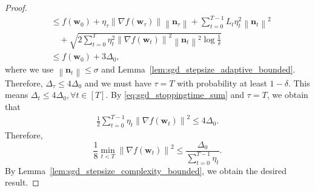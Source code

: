 \documentclass{article}
\newcommand{\Norm}[1]{\left\|#1\right\|}
\newcommand{\bw}{\mathbf{w}}
\newcommand{\bn}{\mathbf{n}}
\begin{document}
\begin{proof}
\begin{align*}
        &\leq f(\bw_0)+\eta_\tau{\Norm{\nabla f(\bw_\tau)}}{\Norm{\bn_\tau}}
        +\sum_{t=0}^{T-1}L_t\eta_t^2\Norm{\bn_t}^2\\
        &\quad+\sqrt{2\sum_{t=0}^T\eta_t^2\Norm{\nabla f(\bw_t)}^2\Norm{\bn_t}^2\log\frac{1}{\delta}}\\
        &\leq f(\bw_0)+3\Delta_0,
    \end{align*}
    where we use $\Norm{\bn_t}\leq\sigma$ and Lemma~\ref{lem:sgd_stepsize_adaptive_bounded}.
    Therefore, $\Delta_\tau\leq 4\Delta_0$ and we must have $\tau=T$ with probability at least $1-\delta$. This means $\Delta_t\leq 4\Delta_0,\forall t\in[T]$. By \eqref{eq:sgd_stoppingtime_sum} and $\tau=T$, we obtain that
    \begin{align*}
        \frac{1}{2}\sum_{t=0}^{T-1}\eta_t\Norm{\nabla f(\bw_t)}^2\leq 4\Delta_0.
    \end{align*}
    Therefore, 
    $$\frac{1}{8}\min_{t<T}\Norm{\nabla f(\bw_t)}^2\leq \frac{\Delta_0}{\sum_{t=0}^{T-1}\eta_t}.$$
    By Lemma~\ref{lem:sgd_stepsize_complexity_bounded}, we obtain the desired result.
    
\end{proof}
\end{document}
